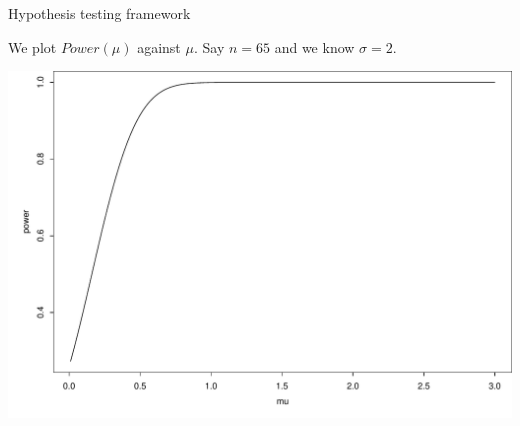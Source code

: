 \documentclass{beamer}\usepackage[]{graphicx}\usepackage[]{color}
\newenvironment{knitrout}{}{} %
\renewenvironment{knitrout}{\begin{spacing}{0.75}\begin{tiny}}{\end{tiny}\end{spacing}}
\begin{document}
\begin{frame}{Hypothesis testing framework}

We plot $Power(\mu)$ against $\mu$.  Say $n=65$ and we know $\sigma=2$. \newline

\begin{knitrout}\small
{}\color{fgcolor}

{\centering \includegraphics[width=0.99\linewidth]{figure/graphics-unnamed-chunk-1-1} 

}



\end{knitrout}

\end{frame}
\end{document}
